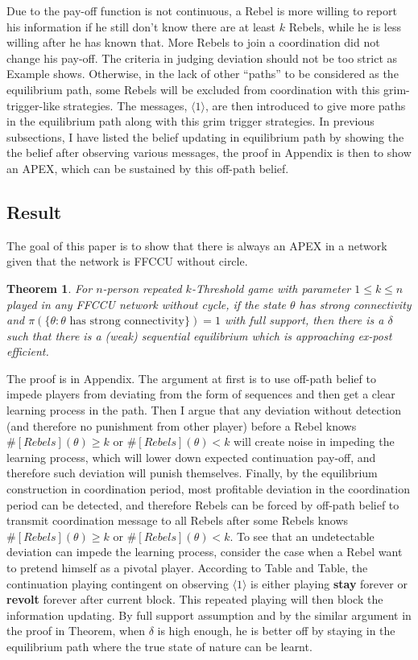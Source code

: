 \documentclass[12pt,letter]{article}
\newtheorem{theorem}{Theorem}
\theoremstyle{definition}
\theoremstyle{remark}
\theoremstyle{claim}
\begin{document}
Due to the pay-off function is not continuous, a Rebel is more willing to report his information if he still don't know there are at least $k$ Rebels, while he is less willing after he has known that. More Rebels to join a coordination did not change his pay-off.  The criteria in judging deviation should not be too strict as Example shows. Otherwise, in the lack of other ``paths'' to be considered as the equilibrium path, some Rebels will be excluded from coordination with this grim-trigger-like strategies. The messages, $\langle 1 \rangle$, are then introduced to give more paths in the equilibrium path along with this grim trigger strategies. In previous subsections, I have listed the belief updating in equilibrium path by showing the the belief after observing various messages, the proof in Appendix is then to show an APEX, which can be sustained by this off-path belief.

\subsection{Result}
\label{sec:result}

The goal of this paper is to show that there is always an APEX in a network given that the network is FFCCU without circle.
\begin{theorem}
\label{thm_main_result}
For $n$-person repeated $k$-Threshold game with parameter $1\leq k \leq n$ played in any FFCCU network without cycle,
if the state $\theta$ has strong connectivity and $\pi(\{\theta: \theta\text{ has strong connectivity}\})=1$ with full support, then there is a $\delta$ such that there is a (weak) sequential equilibrium which is approaching ex-post efficient.
\end{theorem}

The proof is in Appendix. The argument at first is to use off-path belief to impede players from deviating from the form of sequences and then get a clear learning process in the path. Then I argue that any deviation without detection (and therefore no punishment from other player) before a Rebel knows $\#[Rebels](\theta)\geq k$ or $\#[Rebels](\theta)< k$ will create noise in impeding the learning process, which will lower down expected continuation pay-off, and therefore such deviation will punish themselves. Finally, by the equilibrium construction in coordination period, most profitable deviation in the coordination period can be detected, and therefore Rebels can be forced by off-path belief to transmit coordination message  to all Rebels after some Rebels knows $\#[Rebels](\theta)\geq k$ or $\#[Rebels](\theta)< k$. To see that an undetectable deviation can impede the learning process, consider the case when a Rebel want to pretend himself as a pivotal player. According to Table and Table, the continuation playing contingent on observing $\langle 1 \rangle$ is either playing \textbf{stay} forever or \textbf{revolt} forever after current block. This repeated playing will then block the information updating. By full support assumption and by the similar argument in the proof in Theorem, when $\delta$ is high enough, he is better off by staying in the equilibrium path where the true state of nature can be learnt.
\end{document}
